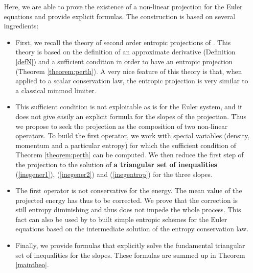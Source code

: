 \documentclass{fldauth}
\theoremstyle{plain}
\theoremstyle{plain}
\theoremstyle{plain}
\theoremstyle{plain}
\theoremstyle{plain}
\theoremstyle{plain}
\begin{document}
Here, we are able to prove the existence of a non-linear
projection for the Euler equations and provide explicit formulas.
The construction is based on several ingredients:
\begin{itemize}
  \item First, we recall the theory of second order entropic
  projections of \cite{bouchut_pertham93}. This theory is based on the definition of an
  approximate derivative (Definition \ref{defN}) and a sufficient
  condition in order to have an entropic projection (Theorem
  \ref{theorem:perth}). A very nice feature of this theory is
  that, when applied to a scalar conservation law, the entropic
  projection is very similar to a classical minmod limiter.
  \item This sufficient condition is not exploitable as is for the Euler system, and it does
  not give easily an explicit formula for the slopes of the
  projection. Thus we propose to seek the projection as the
  composition of two non-linear operators. To build the first operator, we
  work with special variables (density, momentum and a particular
  entropy) for which the sufficient condition of Theorem \ref{theorem:perth}
  can be computed. We then reduce the
  first step of the projection to the solution of \textbf{a
  triangular set of inequalities} (\ref{inegener1}), (\ref{inegener2})
  and (\ref{inegentrop}) for the three slopes.
  \item The first operator is not conservative for the energy. The
  mean value of the projected energy has thus to be corrected. We
  prove that the correction is still entropy diminishing and thus does
  not impede the whole process. This fact can also be used by
 to built simple entropic schemes for the Euler
  equations based on the intermediate solution of the entropy
  conservation law.
  \item Finally, we provide formulas that explicitly
  solve the fundamental triangular set of inequalities for the slopes.
  These formulas are summed up in Theorem \ref{maintheo}.
\end{itemize}
\end{document}
